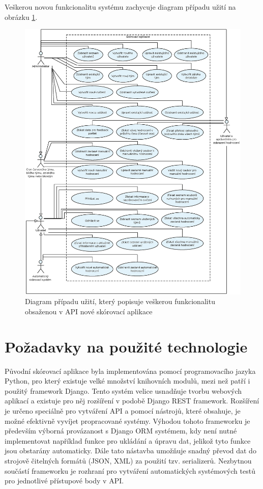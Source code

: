 \documentclass[
  digital, %
  twoside, %
  table,   %
  lof,     %
  lot,     %
]{fithesis3}
\begin{document}
Veškerou novou funkcionalitu systému zachycuje diagram případu užití na obrázku \ref{fig:useCase2}.

\begin{figure}
    \centering
    \includegraphics[width=15cm]{images/Use-case-2.eps}
    \caption{Diagram případu užití, který popisuje veškerou funkcionalitu obsaženou v API nové skórovací aplikace}
    \label{fig:useCase2}
\end{figure}

\section{Požadavky na použité technologie}

Původní skórovací aplikace byla implementována pomocí programovacího jazyka Python, pro který existuje velké množství knihovních modulů, mezi než patří i použitý framework Django. Tento systém velice usnadňuje tvorbu webových aplikací a existuje pro něj rozšíření v podobě Django REST framework. Rozšíření je určeno speciálně pro vytváření API a pomocí nástrojů, které obsahuje, je možné efektivně vyvíjet propracované systémy. Výhodou tohoto frameworku je především výborná provázanost s Django ORM systémem, kdy není nutné implementovat například funkce pro ukládání a úpravu dat, jelikož tyto funkce jsou obstarány automaticky. Dále tato nástavba umožňuje snadný převod dat do strojově čitelných formátů (JSON, XML) za použití tzv. serializerů. Nezbytnou součástí frameworku je rozhraní pro vytváření automatických systémových testů pro jednotlivé přístupové body v API.
\end{document}
